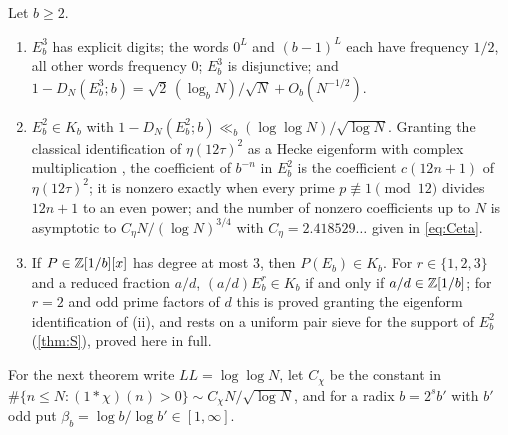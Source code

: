 \documentclass[11pt]{article}
\newcommand{\cnt}{\#}
\newcommand{\LL}{\log\log N}
\begin{document}
\begin{maintheorem}\label{thm:C}
Let $b\ge2$.
\begin{enumerate}[label=\textup{(\roman*)},nosep]
\item $E_b^3$ has explicit digits; the words $0^L$ and $(b-1)^L$ each have
frequency $1/2$, all other words frequency $0$; $E_b^3$ is disjunctive; and
$1-D_N(E_b^3;b)=\sqrt2\,(\log_bN)/\sqrt N+O_b(N^{-1/2})$.
\item $E_b^2\in K_b$ with $1-D_N(E_b^2;b)\ll_b(\LL)/\sqrt{\log N}$. Granting the
classical identification of $\eta(12\tau)^2$ as a Hecke eigenform with complex
multiplication \cite{Serre1985}, the coefficient of $b^{-n}$ in $E_b^2$ is the
coefficient $c(12n+1)$ of $\eta(12\tau)^2$; it is nonzero exactly when every prime
$p\not\equiv1\pmod{12}$ divides $12n+1$ to an even power; and the number of
nonzero coefficients up to $N$ is asymptotic to $C_\eta N/(\log N)^{3/4}$ with
$C_\eta=2.418529\ldots$ given in \eqref{eq:Ceta}.
\item If $P\in\mathbb Z[1/b][x]$ has degree at most $3$, then $P(E_b)\in K_b$. For
$r\in\{1,2,3\}$ and a reduced fraction $a/d$, $(a/d)E_b^r\in K_b$ if and only if
$a/d\in\mathbb Z[1/b]$; for $r=2$ and odd prime factors of $d$ this is proved granting the
eigenform identification of \textup{(ii)}, and rests on a uniform pair sieve for the
support of $E_b^2$ (\cref{thm:S}), proved here in full.
\end{enumerate}
\end{maintheorem}

For the next theorem write $LL=\log\log N$, let $C_\chi$ be the constant in
$\cnt\{n\le N:(1*\chi)(n)>0\}\sim C_\chi N/\sqrt{\log N}$, and for a radix
$b=2^sb'$ with $b'$ odd put $\beta_b=\log b/\log b'\in[1,\infty]$.
\end{document}
